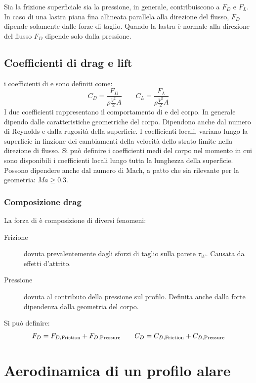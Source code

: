 Sia la frizione superficiale sia la pressione, in generale, contribuiscono a $F_D$ e $F_L$. In caso di una lastra piana fina allineata parallela alla direzione del flusso, $F_D$ dipende solamente dalle forze di taglio.
Quando la lastra è normale alla direzione del flusso $F_D$ dipende solo dalla pressione.

\section{Coefficienti di drag e lift}
i coefficienti di  e  sono definiti come:
\begin{equation}
C_D = \frac{F_D}{\rho \frac{V^2}{2}A} \qquad C_L = \frac{F_L}{\rho \frac{V^2}{2}A}
\end{equation}
I due coefficienti rappresentano il comportamento di  e  del corpo.
In generale dipendo dalle caratteristiche geometriche del corpo. Dipendono anche dal numero di Reynolds e dalla rugosità della superficie.
I coefficienti locali, variano lungo la superficie in finzione dei cambiamenti della velocità dello strato limite nella direzione di flusso.
Si può definire i coefficienti medi del corpo nel momento in cui sono disponibili i coefficienti locali lungo tutta la lunghezza della superficie. 
Possono dipendere anche dal numero di Mach, a patto che sia rilevante per la geometria: $Ma \geq 0.3$.

\subsection{Composizione drag}
La forza di  è composizione di diversi fenomeni:
\begin{description}
\item[Frizione] dovuta prevalentemente dagli sforzi di taglio sulla parete $\tau_W$. Causata da effetti d'attrito.
\item[Pressione] dovuta al contributo della pressione sul profilo. Definita anche dalla forte dipendenza dalla geometria del corpo.
\end{description}
Si può definire:
\begin{equation}
F_D = F_{D, \textup{Friction}} + F_{D, \textup{Pressure}} \qquad C_D = C_{D, \textup{Friction}} + C_{D, \textup{Pressure}}
\end{equation}
\chapter{Aerodinamica di un profilo alare}\label{ch:Airfoil}
